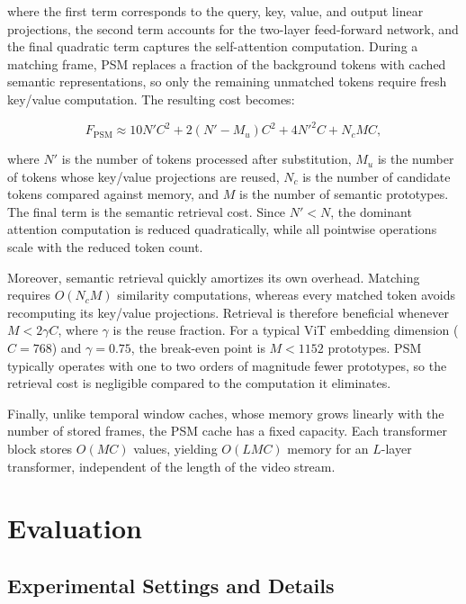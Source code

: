 \documentclass[letterpaper]{article}
\begin{document}
where the first term corresponds to the query, key, value, and output linear projections, the second term accounts for the two-layer feed-forward network, and the final quadratic term captures the self-attention computation.
 During a matching frame, PSM replaces a fraction of the background tokens with cached semantic representations, so only the
remaining unmatched tokens require fresh key/value computation. The
resulting cost becomes:
 
\begin{equation}
F_{\mathrm{PSM}}
\approx
10N'C^2
+
2(N'-M_u)C^2
+
4N'^2C
+
N_cMC,
\end{equation}
 
where $N'$ is the number of tokens processed after substitution,
$M_u$ is the number of tokens whose key/value projections are reused,
$N_c$ is the number of candidate tokens compared against memory, and
$M$ is the number of semantic prototypes. The final term is the semantic
retrieval cost. Since $N'<N$, the
dominant attention computation is reduced quadratically, while all
pointwise operations scale with the reduced token count.
 
Moreover, semantic retrieval quickly amortizes its own overhead.
Matching requires $O(N_cM)$ similarity computations, whereas every
matched token avoids recomputing its key/value projections. Retrieval is therefore beneficial whenever $M < 2\gamma C$,
where $\gamma$ is the reuse fraction. For a typical ViT embedding dimension
($C=768$) and $\gamma=0.75$, the break-even point is $M<1152$ prototypes.
PSM typically operates with one to two orders of magnitude fewer
prototypes, so the retrieval cost is negligible compared to the
computation it eliminates.
 
Finally, unlike temporal window caches, whose memory grows linearly with
the number of stored frames, the PSM cache has a fixed
capacity. Each transformer block stores $O(MC)$ values, yielding
$O(LMC)$ memory for an $L$-layer transformer, independent of the length
of the video stream.

\section{Evaluation}
\label{sec:eval}

\subsection{Experimental Settings and Details}
\label{sec:setup}
\end{document}
